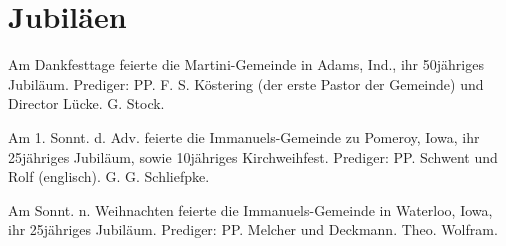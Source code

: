 \chapter[Jubiläen]{Jubiläen}
Am Dankfesttage feierte die Martini-Gemeinde in Adams, Ind., ihr 50jähriges Jubiläum. Prediger: PP. F. S. Köstering (der erste Pastor der Gemeinde) und Director Lücke. G. Stock.

Am 1. Sonnt. d. Adv. feierte die Immanuels-Gemeinde zu Pomeroy, Iowa, ihr 25jähriges Jubiläum, sowie 10jähriges Kirchweihfest. Prediger: PP. Schwent und Rolf (englisch). G. G. Schliefpke.

Am Sonnt. n. Weihnachten feierte die Immanuels-Gemeinde in Waterloo, Iowa, ihr 25jähriges Jubiläum. Prediger: PP. Melcher und Deckmann. Theo. Wolfram.
